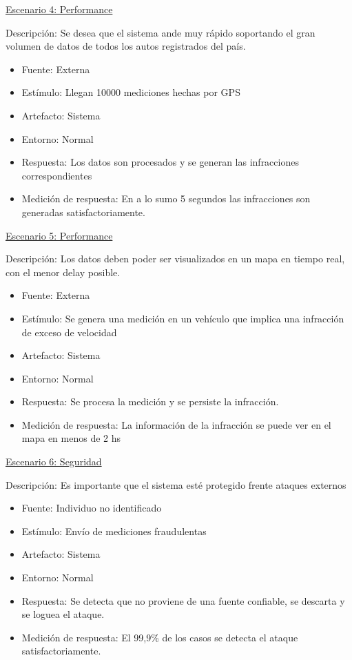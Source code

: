\underline{Escenario 4: Performance}


Descripción: Se desea que el sistema ande muy rápido soportando el gran volumen de datos de todos los autos registrados del país.
\begin{itemize}
\item Fuente: Externa
\item Estímulo: Llegan 10000 mediciones hechas por GPS
\item Artefacto: Sistema
\item Entorno: Normal
\item Respuesta: Los datos son procesados y se generan las infracciones correspondientes
\item Medición de respuesta: En a lo sumo 5 segundos las infracciones son generadas satisfactoriamente.
\end{itemize} 

\underline{Escenario 5: Performance}


Descripción: Los datos deben poder ser visualizados en un mapa en tiempo real, con el menor delay posible.
\begin{itemize}
\item Fuente: Externa
\item Estímulo: Se genera una medición en un vehículo que implica una infracción de exceso de velocidad
\item Artefacto: Sistema
\item Entorno: Normal
\item Respuesta: Se procesa la medición y se persiste la infracción.
\item Medición de respuesta: La información de la infracción se puede ver en el mapa en menos de 2 hs
\end{itemize} 

\underline{Escenario 6: Seguridad}


Descripción: Es importante que el sistema esté protegido frente ataques externos
\begin{itemize}
\item Fuente: Individuo no identificado
\item Estímulo: Envío de mediciones fraudulentas
\item Artefacto: Sistema
\item Entorno: Normal
\item Respuesta: Se detecta que no proviene de una fuente confiable, se descarta y se loguea el ataque. 
\item Medición de respuesta: El 99,9\% de los casos se detecta el ataque satisfactoriamente.
\end{itemize} 

